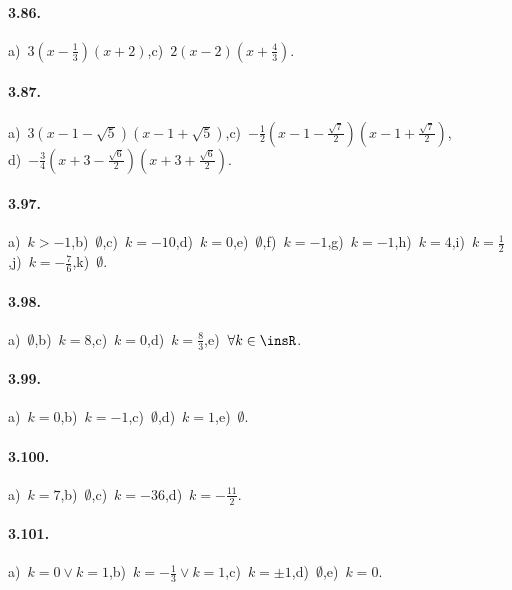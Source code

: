 \paragraph{3.86.} a)~$3 \left(x-\frac{1}{3} \right) (x + 2)$,\quad c)~$2 (x-2) \left(x + \frac{4}{3} \right)$.

\paragraph{3.87.} a)~$3 \left(x-1-\sqrt{5} \right) \left(x-1 + \sqrt{5} \right)$,\quad c)~$- \frac{1}{2} \left(x-1-\frac{\sqrt{7}}{2} \right) \left(x- 1 + \frac{\sqrt{7}}{2} \right)$,\protect\\\quad d)~$- \frac{3}{4} \left(x + 3-\frac{\sqrt{6}}{2} \right) \left(x+ 3 + \frac{\sqrt{6}}{2} \right)$.

\paragraph{3.97.} a)~$k >-1$,\quad b)~$\emptyset$,\quad c)~$k =-10$,\quad d)~$k = 0$,\quad e)~$ \emptyset $,\quad f)~$ k =-1 $,\quad g)~$ k =-1 $,\quad h)~$ k = 4 $,\quad i)~$ k = \frac{1}{2} $,\quad j)~$ k =-\frac{7}{6} $,\quad k)~$\emptyset$.

\paragraph{3.98.} a)~$\emptyset $,\quad b)~$k = 8 $,\quad c)~$ k = 0$,\quad d)~$k = \frac{8}{3} $,\quad e)~$\forall k \in \insR$.

\paragraph{3.99.} a)~$ k = 0 $,\quad b)~$ k =-1 $,\quad c)~$ \emptyset $,\quad d)~$ k = 1 $,\quad e)~$ \emptyset $.

\paragraph{3.100.} a)~$ k = 7 $,\quad b)~$ \emptyset $,\quad c)~$ k =-36 $,\quad d)~$ k =-\frac{11}{2} $.

\paragraph{3.101.} a)~$ k = 0 \vee k = 1 $,\quad b)~$ k =-\frac{1}{3} \vee k = 1 $,\quad c)~$ k = \pm 1 $,\quad d)~$ \emptyset $,\quad e)~$ k=0 $.

